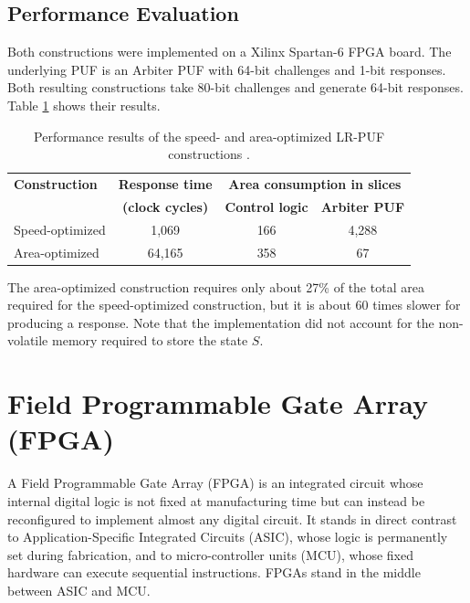 \subsection{Performance Evaluation}
Both constructions were implemented on a Xilinx Spartan-6 FPGA board. The underlying PUF is an Arbiter PUF with 64-bit challenges and 1-bit responses. Both resulting constructions take 80-bit challenges and generate 64-bit responses. Table \ref{tab:lrpuf-perf-paper} shows their results.

\begin{table}[ht!]
\centering
\caption{Performance results of the speed- and area-optimized LR-PUF constructions \cite{10.1007/978-3-642-23951-9_25}.}
\begin{tabular}{lccc}
\hline
\textbf{Construction} & \textbf{Response time} & \multicolumn{2}{c}{\textbf{Area consumption in slices}} \\
 & \textbf{(clock cycles)} & \textbf{Control logic} & \textbf{Arbiter PUF} \\
\hline
Speed-optimized & 1,069    & 166 & 4,288 \\
Area-optimized  & 64,165   & 358 & 67    \\
\hline
\end{tabular}
\label{tab:lrpuf-perf-paper}
\end{table}

The area-optimized construction requires only about 27\% of the total area required for the speed-optimized construction, but it is about 60 times slower for producing a response. Note that the implementation did not account for the non-volatile memory required to store the state $S$.

\section{Field Programmable Gate Array (FPGA)}
A Field Programmable Gate Array (FPGA) is an integrated circuit whose internal digital logic is not fixed at manufacturing time but can instead be reconfigured to implement almost any digital circuit. It stands in direct contrast to Application-Specific Integrated Circuits (ASIC), whose logic is permanently set during fabrication, and to micro-controller units (MCU), whose fixed hardware can execute sequential instructions. FPGAs stand in the middle between ASIC and MCU. 

